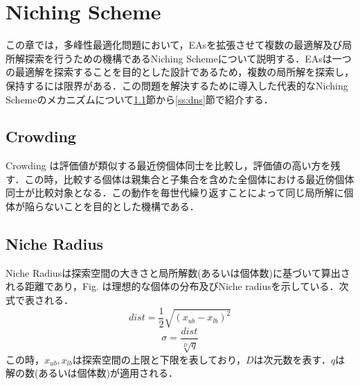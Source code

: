 \documentclass[a4j,11pt]{jarticle}
\begin{document}
\newpage
\section{Niching Scheme}
\label{sec:ns}
この章では，多峰性最適化問題において，EAsを拡張させて複数の最適解及び局所解探索を行うための機構であるNiching Schemeについて説明する．EAsは一つの最適解を探索することを目的とした設計であるため，複数の局所解を探索し，保持するには限界がある．この問題を解決するために導入した代表的なNiching Schemeのメカニズムについて\ref{ss:Crowding}節から\ref{ss:dns}節で紹介する．

\subsection{Crowding}
\label{ss:Crowding}
Crowding \cite{Crowding} は評価値が類似する最近傍個体同士を比較し，評価値の高い方を残す．この時，比較する個体は親集合と子集合を含めた全個体における最近傍個体同士が比較対象となる．この動作を毎世代繰り返すことによって同じ局所解に個体が陥らないことを目的とした機構である．

\subsection{Niche Radius}
\label{ss:nr}
Niche Radiusは探索空間の大きさと局所解数(あるいは個体数)に基づいて算出される距離であり，Fig. は理想的な個体の分布及びNiche radiusを示している．次式で表される．
\begin{equation}
\label{eq:nr-d}
dist=\frac{1}{2}\sqrt{(x_{ub}-x_{lb})^2}
\end{equation}
\begin{equation}
\label{eq:nr-s}
\sigma=\frac{dist}{\sqrt[D]{q}}
\end{equation}
この時，$x_{ub},x_{lb}$は探索空間の上限と下限を表しており，$D$は次元数を表す．$q$は解の数(あるいは個体数)が適用される．
\end{document}
